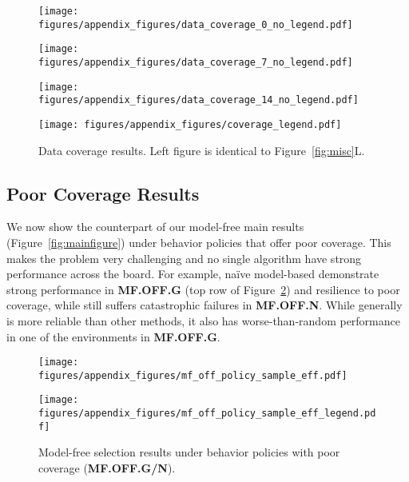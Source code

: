 \begin{figure}[h]
    \centering
    \begin{minipage}{0.25\textwidth}
        \texttt{[image: figures/appendix\_figures/data\_coverage\_0\_no\_legend.pdf]}
    \end{minipage}%
    \begin{minipage}{0.25\textwidth}
        \texttt{[image: figures/appendix\_figures/data\_coverage\_7\_no\_legend.pdf]}
    \end{minipage}%
    \begin{minipage}{0.25\textwidth}
        \texttt{[image: figures/appendix\_figures/data\_coverage\_14\_no\_legend.pdf]}
    \end{minipage}%
    \begin{minipage}{0.25\textwidth}
        \texttt{[image: figures/appendix\_figures/coverage\_legend.pdf]}
    \end{minipage}%
    \caption{Data coverage results. Left figure is identical to Figure~\ref{fig:misc}L. \label{fig:coverage-complete}}
\end{figure}

\subsection{Poor Coverage Results} \label{app:poor-coverage}
We now show the counterpart of our model-free main results (Figure~\ref{fig:mainfigure}) under behavior policies that offer poor coverage. This makes the problem very challenging and no single algorithm have strong performance across the board. For example, na\"ive model-based demonstrate strong performance in \textbf{MF.OFF.G} (top row of Figure~\ref{fig:poor-coverage}) and resilience to poor coverage, while still suffers  catastrophic failures in \textbf{MF.OFF.N}. While \lstd generally is more reliable than other methods, it also has worse-than-random performance in one of the environments in \textbf{MF.OFF.G}.

\begin{figure}[h!]
    \centering
    \begin{minipage}{0.75\textwidth}
        \texttt{[image: figures/appendix\_figures/mf\_off\_policy\_sample\_eff.pdf]}
    \end{minipage}%
    \begin{minipage}{0.25\textwidth}
%
%
                \texttt{[image: figures/appendix\_figures/mf\_off\_policy\_sample\_eff\_legend.pdf]}
%
%
%
        \caption{Model-free selection results under behavior policies with poor coverage (\textbf{MF.OFF.G/N}). \label{fig:poor-coverage}}
%
%
    \end{minipage}
\end{figure}

